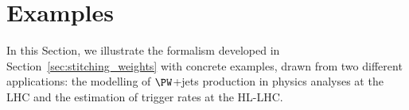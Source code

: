 \section{Examples}
\label{sec:examples}

In this Section, we illustrate the formalism developed in Section~\ref{sec:stitching_weights} with concrete examples,
drawn from two different applications: the modelling of $\PW$+jets production in physics analyses at the LHC
and the estimation of trigger rates at the HL-LHC.
